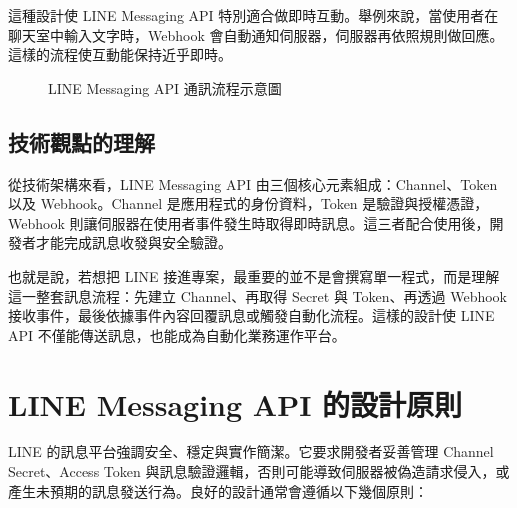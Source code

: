 這種設計使 LINE Messaging API 特別適合做即時互動。舉例來說，當使用者在聊天室中輸入文字時，Webhook 會自動通知伺服器，伺服器再依照規則做回應。這樣的流程使互動能保持近乎即時。

\begin{figure}[H]
    \centering
    \caption{LINE Messaging API 通訊流程示意圖}
\end{figure}

\subsection{技術觀點的理解}

從技術架構來看，LINE Messaging API 由三個核心元素組成：Channel、Token 以及 Webhook。Channel 是應用程式的身份資料，Token 是驗證與授權憑證，Webhook 則讓伺服器在使用者事件發生時取得即時訊息。這三者配合使用後，開發者才能完成訊息收發與安全驗證。

也就是說，若想把 LINE 接進專案，最重要的並不是會撰寫單一程式，而是理解這一整套訊息流程：先建立 Channel、再取得 Secret 與 Token、再透過 Webhook 接收事件，最後依據事件內容回覆訊息或觸發自動化流程。這樣的設計使 LINE API 不僅能傳送訊息，也能成為自動化業務運作平台。

\section{LINE Messaging API 的設計原則}

LINE 的訊息平台強調安全、穩定與實作簡潔。它要求開發者妥善管理 Channel Secret、Access Token 與訊息驗證邏輯，否則可能導致伺服器被偽造請求侵入，或產生未預期的訊息發送行為。良好的設計通常會遵循以下幾個原則：

